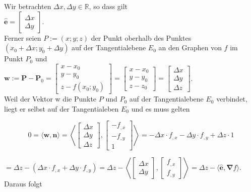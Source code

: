 \documentclass[10pt]{article}
\begin{document}
Wir betrachten $\Delta x, \Delta y \in \mathbb{R}$, so dass gilt\\
$\hat{\mathbf{e}}=\left[\begin{array}{l}\Delta x \\ \Delta y\end{array}\right]$.\\
Ferner seien $P:=(x ; y ; z)$ der Punkt oberhalb des Punktes $\left(x_{0}+\Delta x ; y_{0}+\Delta y\right)$ auf der Tangentialebene $E_{0}$ an den Graphen von $f$ im Punkt $P_{0}$ und\\
$\mathbf{w}:=\mathbf{P}-\mathbf{P}_{0}=\left[\begin{array}{c}x-x_{0} \\ y-y_{0} \\ z-f\left(x_{0} ; y_{0}\right)\end{array}\right]=\left[\begin{array}{c}x-x_{0} \\ y-y_{0} \\ z-z_{0}\end{array}\right]=\left[\begin{array}{c}\Delta x \\ \Delta y \\ \Delta z\end{array}\right]$.\\
Weil der Vektor w die Punkte $P$ und $P_{0}$ auf der Tangentialebene $E_{0}$ verbindet, liegt er selbst auf der Tangentialeben $E_{0}$ und es muss gelten

\[
0=\langle\mathbf{w}, \mathbf{n}\rangle=\left\langle\left[\begin{array}{c}\Delta x  \tag{2.195}\\ \Delta y \\ \Delta z\end{array}\right],\left[\begin{array}{c}-f_{, x} \\ -f_{, y} \\ 1\end{array}\right]\right\rangle=-\Delta x \cdot f_{, x}-\Delta y \cdot f_{, y}+\Delta z \cdot 1
\]

$=\Delta z-\left(\Delta x \cdot f_{, x}+\Delta y \cdot f_{, y}\right)=\Delta z-\left\langle\left[\begin{array}{c}\Delta x \\ \Delta y\end{array}\right],\left[\begin{array}{l}f_{, x} \\ f_{, y}\end{array}\right]\right\rangle=\Delta z-\langle\hat{\mathbf{e}}, \boldsymbol{\nabla} f\rangle$.\\
Daraus folgt
\end{document}
